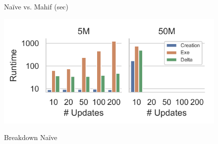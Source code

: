 \begin{figure}[t]
\begin{minipage}[b]{0.29\linewidth}
               \vspace{-4mm}
               \caption{Naïve                                         vs.                                     Mahif                          (sec)}
               \label{fig:Naive                                       vs                                      Mahif}
               \end{minipage}
               \begin{minipage}[b]{0.35\linewidth}
               \centering
               \includegraphics[width=0.95\linewidth,trim=0 8 0                                     0,                             clip]{imgs/felix_naive_breakdown.pdf}    \\
               \vspace{-3mm}
               \caption{Breakdown Naïve}
               \label{fig:Naive Method}
               \end{minipage}
\begin{minipage}[b]{0.34\linewidth}
\centering

\end{minipage}
\end{figure}
